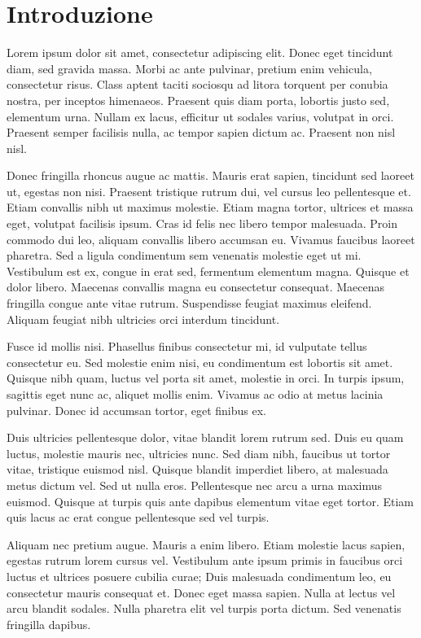 \chapter*{Introduzione}

Lorem ipsum dolor sit amet, consectetur adipiscing elit. Donec eget tincidunt diam, sed gravida massa. Morbi ac ante pulvinar, pretium enim vehicula, consectetur risus. Class aptent taciti sociosqu ad litora torquent per conubia nostra, per inceptos himenaeos. Praesent quis diam porta, lobortis justo sed, elementum urna. Nullam ex lacus, efficitur ut sodales varius, volutpat in orci. Praesent semper facilisis nulla, ac tempor sapien dictum ac. Praesent non nisl nisl.

Donec fringilla rhoncus augue ac mattis. Mauris erat sapien, tincidunt sed laoreet ut, egestas non nisi. Praesent tristique rutrum dui, vel cursus leo pellentesque et. Etiam convallis nibh ut maximus molestie. Etiam magna tortor, ultrices et massa eget, volutpat facilisis ipsum. Cras id felis nec libero tempor malesuada. Proin commodo dui leo, aliquam convallis libero accumsan eu. Vivamus faucibus laoreet pharetra. Sed a ligula condimentum sem venenatis molestie eget ut mi. Vestibulum est ex, congue in erat sed, fermentum elementum magna. Quisque et dolor libero. Maecenas convallis magna eu consectetur consequat. Maecenas fringilla congue ante vitae rutrum. Suspendisse feugiat maximus eleifend. Aliquam feugiat nibh ultricies orci interdum tincidunt.

Fusce id mollis nisi. Phasellus finibus consectetur mi, id vulputate tellus consectetur eu. Sed molestie enim nisi, eu condimentum est lobortis sit amet. Quisque nibh quam, luctus vel porta sit amet, molestie in orci. In turpis ipsum, sagittis eget nunc ac, aliquet mollis enim. Vivamus ac odio at metus lacinia pulvinar. Donec id accumsan tortor, eget finibus ex.

Duis ultricies pellentesque dolor, vitae blandit lorem rutrum sed. Duis eu quam luctus, molestie mauris nec, ultricies nunc. Sed diam nibh, faucibus ut tortor vitae, tristique euismod nisl. Quisque blandit imperdiet libero, at malesuada metus dictum vel. Sed ut nulla eros. Pellentesque nec arcu a urna maximus euismod. Quisque at turpis quis ante dapibus elementum vitae eget tortor. Etiam quis lacus ac erat congue pellentesque sed vel turpis.

Aliquam nec pretium augue. Mauris a enim libero. Etiam molestie lacus sapien, egestas rutrum lorem cursus vel. Vestibulum ante ipsum primis in faucibus orci luctus et ultrices posuere cubilia curae; Duis malesuada condimentum leo, eu consectetur mauris consequat et. Donec eget massa sapien. Nulla at lectus vel arcu blandit sodales. Nulla pharetra elit vel turpis porta dictum. Sed venenatis fringilla dapibus.


